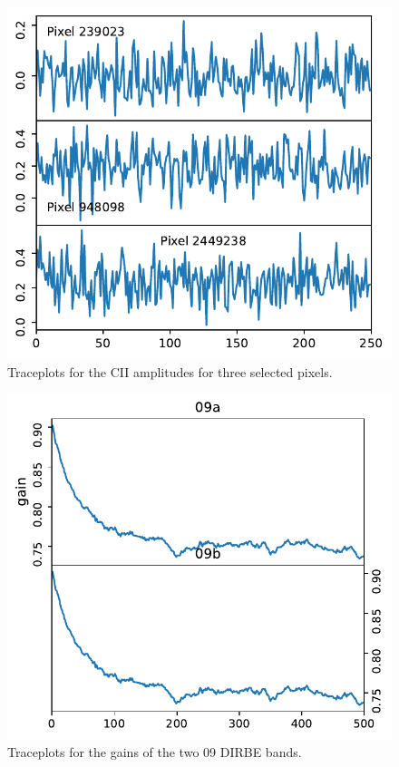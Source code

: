 \documentclass{aa}
\begin{document}
\begin{figure}
    \centering
    \includegraphics[width=\columnwidth]{figures/traceplots_cii_amps.pdf}
    \caption{Traceplots for the CII amplitudes for three selected pixels.}
    \label{fig:traceplots_cii_amps}
\end{figure}

\begin{figure}
    \centering
    \includegraphics[width=\columnwidth]{figures/traceplots_cii_gains.pdf}
    \caption{Traceplots for the gains of the two 09 DIRBE bands.}
    \label{fig:traceplots_cii_gains}
\end{figure}
\end{document}
